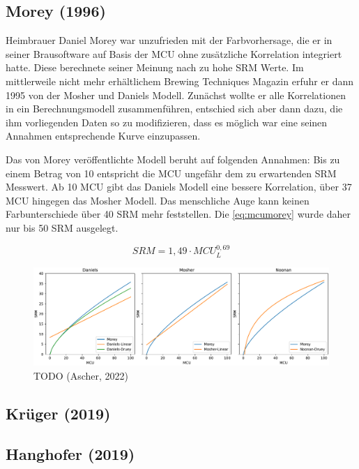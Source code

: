 \documentclass[a4paper,parskip=half]{scrartcl}
\newcommand{\MCUL}{\mathit{MCU}_{L}}
\newcommand{\SRM}{\mathit{SRM}}
\begin{document}
\subsection*{Morey (1996)}

Heimbrauer Daniel Morey war unzufrieden mit der Farbvorhersage, die er in seiner Brausoftware auf Basis der MCU ohne zusätzliche Korrelation integriert hatte. Diese berechnete seiner Meinung nach zu hohe SRM Werte. Im mittlerweile nicht mehr erhältlichem Brewing Techniques Magazin erfuhr er dann 1995 von der Mosher und Daniels Modell. Zunächst wollte er alle Korrelationen in ein Berechnungsmodell zusammenführen, entschied sich aber dann dazu, die ihm vorliegenden Daten so zu modifizieren, dass es möglich war eine seinen Annahmen entsprechende Kurve einzupassen. \parencite{Smith2010}

Das von Morey veröffentlichte Modell beruht auf folgenden Annahmen: Bis zu einem Betrag von 10 entspricht die MCU ungefähr dem zu erwartenden SRM Messwert. Ab 10 MCU gibt das Daniels Modell eine bessere Korrelation, über 37 MCU hingegen das Mosher Modell. Das menschliche Auge kann keinen Farbunterschiede über 40 SRM mehr feststellen. Die \autoref{eq:mcumorey} wurde daher nur bis 50 SRM ausgelegt.
\parencite{Morey2004}

\begin{equation}
\SRM = 1,49 \cdot \MCUL^{0,69}
\label{eq:mcumorey}
\end{equation}



\begin{figure}[h]
\centering
\includegraphics[width=14cm]{graph_srm.pdf}
\caption{TODO (Ascher, 2022)}
\label{fig:mcucompare}
\end{figure}

\subsection*{Krüger (2019)}



\subsection*{Hanghofer (2019)}
\end{document}
